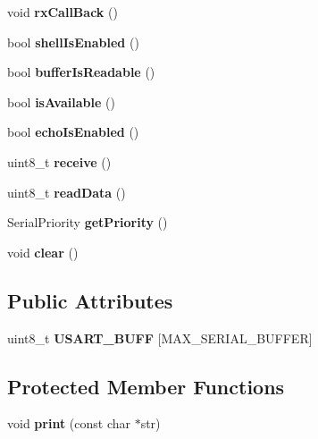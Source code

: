 \begin{DoxyCompactItemize}
void {\bfseries rx\+Call\+Back} ()
\item 
\mbox{\label{classSerial_a624ff162bdefdca9bcaedc3720137e1a}} 
bool {\bfseries shell\+Is\+Enabled} ()
\item 
\mbox{\label{classSerial_abe5d32f3ea45b75b8cf996b2054bc252}} 
bool {\bfseries buffer\+Is\+Readable} ()
\item 
\mbox{\label{classSerial_afc5602930c046d828392eb1eea31c045}} 
bool {\bfseries is\+Available} ()
\item 
\mbox{\label{classSerial_add2575d5d0352d7dbb4d5aff0c08df7e}} 
bool {\bfseries echo\+Is\+Enabled} ()
\item 
\mbox{\label{classSerial_a2acff37fe9102262032a3f8767204c52}} 
uint8\+\_\+t {\bfseries receive} ()
\item 
\mbox{\label{classSerial_a6453a654842a1b901bef5b789c38de65}} 
uint8\+\_\+t {\bfseries read\+Data} ()
\item 
\mbox{\label{classSerial_a4deaf90a27cb5d2d146ee7636ed1d025}} 
Serial\+Priority {\bfseries get\+Priority} ()
\item 
\mbox{\label{classSerial_a5348fa97c36cc7f5444252d952cbedde}} 
void {\bfseries clear} ()
\end{DoxyCompactItemize}
\subsection*{Public Attributes}
\begin{DoxyCompactItemize}
\item 
\mbox{\label{classSerial_a090daed60c890a076321d6bcd1c3ef0f}} 
uint8\+\_\+t {\bfseries U\+S\+A\+R\+T\+\_\+\+B\+U\+FF} \mbox{[}M\+A\+X\+\_\+\+S\+E\+R\+I\+A\+L\+\_\+\+B\+U\+F\+F\+ER\mbox{]}
\end{DoxyCompactItemize}
\subsection*{Protected Member Functions}
\begin{DoxyCompactItemize}
\item 
\mbox{\label{classSerial_a89295653be64224bbe1a11b572d9b0e4}} 
void {\bfseries print} (const char $\ast$str)
\end{DoxyCompactItemize}
